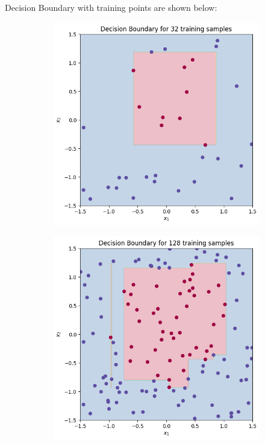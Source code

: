 \documentclass[a4paper]{article}
\theoremstyle{definition}
\newenvironment{soln}{
    \leavevmode\color{blue}\ignorespaces
}{}
\begin{document}
\begin{enumerate}
\begin{itemize}
\begin{soln}
    Decision Boundary with training points are shown below:\\
    \begin{figure}[H]
        \begin{subfigure}{0.5\textwidth}
            \centering
            \includegraphics[scale=0.4]{Images/Q7/DTq7_32.png}
            \label{fig:q7_32}
        \end{subfigure}%
        \begin{subfigure}{0.5\textwidth}
            \centering
            \includegraphics[scale=0.4]{Images/Q7/DTq7_128.png}

\end{subfigure}
\end{figure}
\end{soln}
\end{itemize}
\end{enumerate}
\end{document}
